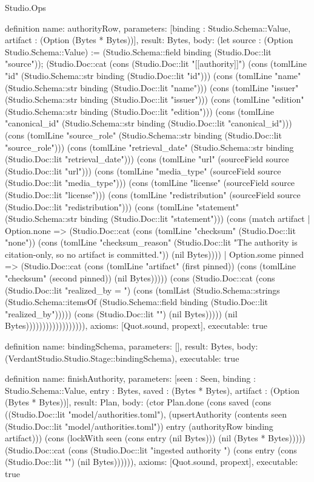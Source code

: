 \begin{lexlean}{Studio.Ops}
\begin{semanticmodule}
definition{
  name: authorityRow,
  parameters: [binding : Studio.Schema::Value, artifact : (Option (Bytes * Bytes))],
  result: Bytes,
  body: (let source : (Option Studio.Schema::Value) := (Studio.Schema::field binding (Studio.Doc::lit "source")); (Studio.Doc::cat (cons (Studio.Doc::lit "[[authority]]\n") (cons (tomlLine "id" (Studio.Schema::str binding (Studio.Doc::lit "id"))) (cons (tomlLine "name" (Studio.Schema::str binding (Studio.Doc::lit "name"))) (cons (tomlLine "issuer" (Studio.Schema::str binding (Studio.Doc::lit "issuer"))) (cons (tomlLine "edition" (Studio.Schema::str binding (Studio.Doc::lit "edition"))) (cons (tomlLine "canonical_id" (Studio.Schema::str binding (Studio.Doc::lit "canonical_id"))) (cons (tomlLine "source_role" (Studio.Schema::str binding (Studio.Doc::lit "source_role"))) (cons (tomlLine "retrieval_date" (Studio.Schema::str binding (Studio.Doc::lit "retrieval_date"))) (cons (tomlLine "url" (sourceField source (Studio.Doc::lit "url"))) (cons (tomlLine "media_type" (sourceField source (Studio.Doc::lit "media_type"))) (cons (tomlLine "license" (sourceField source (Studio.Doc::lit "license"))) (cons (tomlLine "redistribution" (sourceField source (Studio.Doc::lit "redistribution"))) (cons (tomlLine "statement" (Studio.Schema::str binding (Studio.Doc::lit "statement"))) (cons (match artifact
        | Option.none => (Studio.Doc::cat (cons (tomlLine "checksum" (Studio.Doc::lit "none")) (cons (tomlLine "checksum_reason" (Studio.Doc::lit "The authority is citation-only, so no artifact is committed.")) (nil Bytes))))
        | Option.some pinned => (Studio.Doc::cat (cons (tomlLine "artifact" (first pinned)) (cons (tomlLine "checksum" (second pinned)) (nil Bytes))))) (cons (Studio.Doc::cat (cons (Studio.Doc::lit "realized_by = ") (cons (tomlList (Studio.Schema::strings (Studio.Schema::itemsOf (Studio.Schema::field binding (Studio.Doc::lit "realized_by"))))) (cons (Studio.Doc::lit "\n") (nil Bytes))))) (nil Bytes)))))))))))))))))),
  axioms: [Quot.sound, propext],
  executable: true
}


definition{
  name: bindingSchema,
  parameters: [],
  result: Bytes,
  body: (VerdantStudio.Studio.Stage::bindingSchema),
  executable: true
}


definition{
  name: finishAuthority,
  parameters: [seen : Seen, binding : Studio.Schema::Value, entry : Bytes, saved : (Bytes * Bytes), artifact : (Option (Bytes * Bytes))],
  result: Plan,
  body: (ctor Plan.done (cons saved (cons ((Studio.Doc::lit "model/authorities.toml"), (upsertAuthority (contents seen (Studio.Doc::lit "model/authorities.toml")) entry (authorityRow binding artifact))) (cons (lockWith seen (cons entry (nil Bytes))) (nil (Bytes * Bytes))))) (Studio.Doc::cat (cons (Studio.Doc::lit "ingested authority ") (cons entry (cons (Studio.Doc::lit "\n") (nil Bytes)))))),
  axioms: [Quot.sound, propext],
  executable: true
}


\end{semanticmodule}
\end{lexlean}
